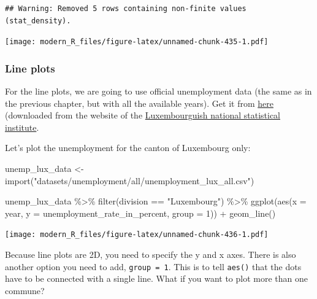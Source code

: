 \documentclass[
]{article}
\newenvironment{Shaded}{\begin{snugshade}}{\end{snugshade}}
\newcommand{\AttributeTok}[1]{\textcolor[rgb]{0.77,0.63,0.00}{#1}}
\newcommand{\DecValTok}[1]{\textcolor[rgb]{0.00,0.00,0.81}{#1}}
\newcommand{\FunctionTok}[1]{\textcolor[rgb]{0.00,0.00,0.00}{#1}}
\newcommand{\NormalTok}[1]{#1}
\newcommand{\OtherTok}[1]{\textcolor[rgb]{0.56,0.35,0.01}{#1}}
\newcommand{\SpecialCharTok}[1]{\textcolor[rgb]{0.00,0.00,0.00}{#1}}
\newcommand{\StringTok}[1]{\textcolor[rgb]{0.31,0.60,0.02}{#1}}
\begin{document}
\begin{verbatim}
## Warning: Removed 5 rows containing non-finite values (stat_density).
\end{verbatim}

\texttt{[image: modern\_R\_files/figure-latex/unnamed-chunk-435-1.pdf]}

\hypertarget{line-plots}{%
\subsubsection{Line plots}\label{line-plots}}

For the line plots, we are going to use official unemployment data (the same as in the previous
chapter, but with all the available years). Get it from
\href{https://github.com/b-rodrigues/modern_R/tree/master/datasets/unemployment/all}{here}
(downloaded from the website of the \href{https://lustat.statec.lu/vis?pg=0\&df\%5Bds\%5D=release\&df\%5Bid\%5D=DF_X026\&df\%5Bag\%5D=LU1\&df\%5Bvs\%5D=1.0\&pd=2021\%2C\&dq=..A\&ly\%5Brw\%5D=SPECIFICATION\&ly\%5Bcl\%5D=VARIABLE\&lc=en}{Luxembourguish national statistical institute}.

Let's plot the unemployment for the canton of Luxembourg only:

\begin{Shaded}
\begin{Highlighting}[]
\NormalTok{unemp\_lux\_data }\OtherTok{\textless{}{-}} \FunctionTok{import}\NormalTok{(}\StringTok{"datasets/unemployment/all/unemployment\_lux\_all.csv"}\NormalTok{)}

\NormalTok{unemp\_lux\_data }\SpecialCharTok{\%\textgreater{}\%}
  \FunctionTok{filter}\NormalTok{(division }\SpecialCharTok{==} \StringTok{"Luxembourg"}\NormalTok{) }\SpecialCharTok{\%\textgreater{}\%}
  \FunctionTok{ggplot}\NormalTok{(}\FunctionTok{aes}\NormalTok{(}\AttributeTok{x =}\NormalTok{ year, }\AttributeTok{y =}\NormalTok{ unemployment\_rate\_in\_percent, }\AttributeTok{group =} \DecValTok{1}\NormalTok{)) }\SpecialCharTok{+}
  \FunctionTok{geom\_line}\NormalTok{()}
\end{Highlighting}
\end{Shaded}

\texttt{[image: modern\_R\_files/figure-latex/unnamed-chunk-436-1.pdf]}

Because line plots are 2D, you need to specify the y and x axes. There is also another option you
need to add, \texttt{group\ =\ 1}. This is to tell \texttt{aes()} that the dots have to be connected with a single
line. What if you want to plot more than one commune?
\end{document}
